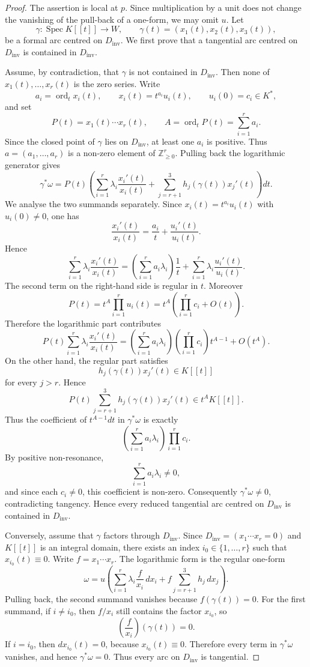 \documentclass[10pt,a4paper]{amsart}
\numberwithin{equation}{section}
\newcommand{\Spec}{\operatorname{Spec}}
\newcommand{\ord}{\operatorname{ord}}
\newcommand{\Dinv}{D_{\mathrm{inv}}}
\newcommand{\bZ}{\mathbb Z}
\begin{document}
\begin{proof}
The assertion is local at \(p\).  Since multiplication by a unit does not
change the vanishing of the pull-back of a one-form, we may omit \(u\).
Let
\[
\gamma:\Spec K[[t]]\longrightarrow W,
\qquad
\gamma(t)=(x_1(t),x_2(t),x_3(t)),
\]
be a formal arc centred on \(\Dinv\).  We first prove that a tangential arc
centred on \(\Dinv\) is contained in \(\Dinv\).

Assume, by contradiction, that \(\gamma\) is not contained in \(\Dinv\).
Then none of \(x_1(t),\ldots,x_r(t)\) is the zero series.  Write
\[
a_i=\ord_t x_i(t),\qquad
x_i(t)=t^{a_i}u_i(t),
\qquad
u_i(0)=c_i\in K^*,
\]
and set
\[
P(t)=x_1(t)\cdots x_r(t),\qquad
A=\ord_t P(t)=\sum_{i=1}^r a_i .
\]
Since the closed point of \(\gamma\) lies on \(\Dinv\), at least one \(a_i\)
is positive.  Thus \(a=(a_1,\ldots,a_r)\) is a non-zero element of
\(\bZ_{\geq 0}^r\).
Pulling back the logarithmic generator gives
\[
\gamma^*\omega
=
P(t)
\left(
\sum_{i=1}^r\lambda_i\frac{x_i'(t)}{x_i(t)}
+
\sum_{j=r+1}^3 h_j(\gamma(t))x_j'(t)
\right)dt .
\]
We analyse the two summands separately.  Since
\(x_i(t)=t^{a_i}u_i(t)\) with \(u_i(0)\neq0\), one has
\[
\frac{x_i'(t)}{x_i(t)}
=
\frac{a_i}{t}+\frac{u_i'(t)}{u_i(t)}.
\]
Hence
\[
\sum_{i=1}^r\lambda_i\frac{x_i'(t)}{x_i(t)}
=
\left(\sum_{i=1}^r a_i\lambda_i\right)\frac{1}{t}
+
\sum_{i=1}^r\lambda_i\frac{u_i'(t)}{u_i(t)}.
\]
The second term on the right-hand side is regular in \(t\).  Moreover
\[
P(t)
=
t^A\prod_{i=1}^r u_i(t)
=
t^A
\left(
\prod_{i=1}^r c_i+O(t)
\right).
\]
Therefore the logarithmic part contributes
\[
P(t)
\sum_{i=1}^r\lambda_i\frac{x_i'(t)}{x_i(t)}
=
\left(\sum_{i=1}^r a_i\lambda_i\right)
\left(\prod_{i=1}^r c_i\right)t^{A-1}
+
O(t^A).
\]
On the other hand, the regular part satisfies
\[
h_j(\gamma(t))x_j'(t)\in K[[t]]
\]
for every \(j>r\).  Hence
\[
P(t)\sum_{j=r+1}^3 h_j(\gamma(t))x_j'(t)
\in t^A K[[t]].
\]
Thus the coefficient of \(t^{A-1}dt\) in \(\gamma^*\omega\) is exactly
\[
\left(\sum_{i=1}^r a_i\lambda_i\right)
\prod_{i=1}^r c_i .
\]
By positive non-resonance,
\[
\sum_{i=1}^r a_i\lambda_i\neq0,
\]
and since each \(c_i\neq0\), this coefficient is non-zero.  Consequently
\(\gamma^*\omega\neq0\), contradicting tangency.  Hence every reduced
tangential arc centred on \(\Dinv\) is contained in \(\Dinv\).

Conversely, assume that \(\gamma\) factors through \(\Dinv\).  Since
$
\Dinv=(x_1\cdots x_r=0)
$
and \(K[[t]]\) is an integral domain, there exists an index
\(i_0\in\{1,\ldots,r\}\) such that
$
x_{i_0}(t)\equiv0.
$
Write \(f=x_1\cdots x_r\).  The logarithmic form is the regular one-form
\[
\omega
=
u\left(
\sum_{i=1}^r\lambda_i\frac{f}{x_i}\,dx_i
+
f\sum_{j=r+1}^3 h_j\,dx_j
\right).
\]
Pulling back, the second summand vanishes because $
f(\gamma(t))=0.
$
For the first summand, if \(i\neq i_0\), then \(f/x_i\) still contains the
factor \(x_{i_0}\), so
\[
\left(\frac{f}{x_i}\right)(\gamma(t))=0.
\]
If \(i=i_0\), then \(dx_{i_0}(t)=0\), because \(x_{i_0}(t)\equiv0\).
Therefore every term in \(\gamma^*\omega\) vanishes, and hence
$
\gamma^*\omega=0.
$
Thus every arc on \(\Dinv\) is tangential.


\end{proof}
\end{document}
